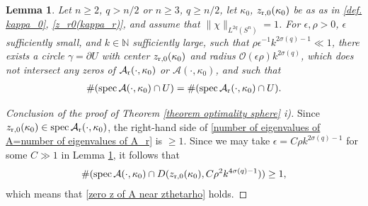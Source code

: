 \documentclass[12pt]{amsart}
\newcommand{\N}{{\mathbb N}}
\newcommand\eps{\epsilon}
\DeclareMathOperator{\spec}{spec}
\newtheorem{lemma}[theorem]{Lemma}
\begin{document}
\begin{lemma}\label{lemma curve}
Let $n\geq 2$, $q>n/2$ or $n\geq 3$, $q\geq n/2$, let $\kappa_0$, $z_{{\rm r},0}(\kappa_{0})$ be as as in \eqref{def. kappa_0}, \eqref{z_r0(kappa_r)}, and assume that $\|\chi\|_{L^{2q}(S^n)}=1$. 
For $\eps,\rho>0$, $\eps$ sufficiently small, and $k\in \N$ sufficiently large, such that $\rho\eps^{-1}k^{2\sigma(q)-1}\ll 1$, there exists a circle $\gamma=\partial U$ with center $z_{{\rm r},0}(\kappa_{0})$ and radius $\mathcal{O}(\eps\rho)k^{2\sigma(q)}$, which does not intersect any zeros of $\mathcal{A}_{\rm r}(\cdot,\kappa_{0})$ or $\mathcal{A}(\cdot,\kappa_{0})$, and such that 
\begin{align}\label{number of eigenvalues of A=number of eigenvalues of A_r}
    \#(\spec{\mathcal{A}(\cdot,\kappa_0)}\cap U)=\#(\spec{\mathcal{A}_{\rm r}(\cdot,\kappa_0)}\cap U). 
\end{align}
\end{lemma}

\begin{proof}[Conclusion of the proof of Theorem \ref{theorem optimality sphere} i)]
Since $z_{{\rm r},0}(\kappa_{0})\in \spec{\mathcal{A}_{\rm r}(\cdot,\kappa_0)}$, the right-hand side of \eqref{number of eigenvalues of A=number of eigenvalues of A_r} is $\geq 1$.
Since we may take $\eps=C\rho k^{2\sigma(q)-1}$ for some $C\gg 1$ in Lemma \ref{lemma curve}, it follows that
\begin{align}
    \#(\spec{\mathcal{A}(\cdot,\kappa_0)}\cap D(z_{{\rm r},0}(\kappa_{0}),C\rho^2 k^{4\sigma(q)-1}))\geq 1,
\end{align}
 which means that \eqref{zero z of A near zthetarho} holds.
 \end{proof}
\end{document}
